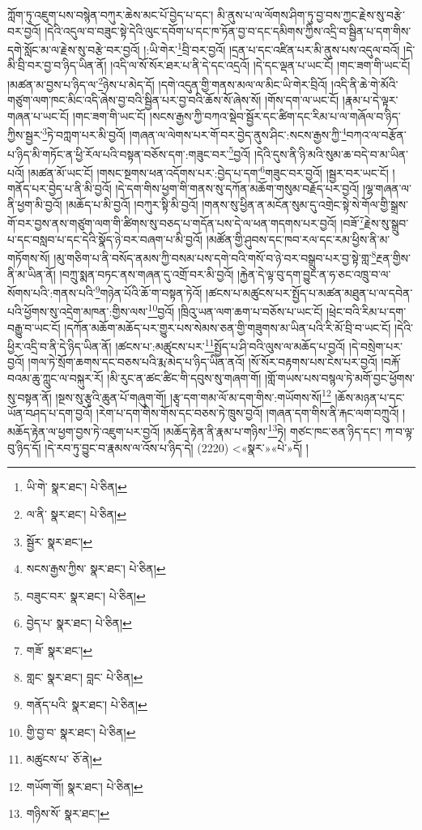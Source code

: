 ཀློག་ཏུ་འཇུག་པས་བསྙེན་བཀུར་ཆེས་མང་པོ་བྱེད་པ་དང་། མི་ནུས་པ་ལ་ལོགས་ཤིག་ཏུ་བྱ་བས་ཀྱང་རྗེས་སུ་བརྩེ་བར་བྱའོ། །དེའི་འདུལ་བ་བཟུང་སྟེ་དེའི་ལུང་དབོག་པ་དང་ཁ་ཏོན་བྱ་བ་དང་དམིགས་ཀྱིས་འདྲི་བ་སྦྱིན་པ་དག་གིས་དགེ་སློང་མ་ལ་རྗེས་སུ་བརྩེ་བར་བྱའོ། །:ཡི་གེར་\footnote{ཡི་གེ་  སྣར་ཐང་།  པེ་ཅིན། }བྲི་བར་བྱའོ། །དྲན་པ་དང་འཛིན་པར་མི་ནུས་པས་འདུལ་བའོ། །དེ་མི་བྲི་བར་བྱ་བ་ཉིད་ཡིན་ནོ། །འདི་ལ་སོ་སོར་ཐར་པ་ནི་དེ་དང་འདྲའོ། །དེ་དང་ལྡན་པ་ཡང་ངོ། །གང་ཟག་གི་ཡང་ངོ། །མཚན་མ་བྱས་པ་ཉིད་ལ་\footnote{ལ་ནི་  སྣར་ཐང་།  པེ་ཅིན། }ཉེས་པ་མེད་དོ། །དགེ་འདུན་གྱི་གནས་མལ་ལ་མིང་ཡི་གེར་བྲིའོ། །འདི་ནི་ཆེ་གེ་མོའི་གཙུག་ལག་ཁང་མིང་འདི་ཞེས་བྱ་བའི་སྦྱིན་པར་བྱ་བའི་ཆོས་སོ་ཞེས་སོ། །གོས་དག་ལ་ཡང་ངོ། །རྣམ་པ་དེ་ལྟར་གཞན་པ་ཡང་ངོ། །གང་ཟག་གི་ཡང་ངོ། །སངས་རྒྱས་ཀྱི་བཀའ་སྡེབ་སྦྱོར་དང་ཚིག་དང་རིམ་པ་ལ་གཞོལ་བ་ཉིད་ཀྱིས་སྦྱར་\footnote{སྦྱོར་  སྣར་ཐང་། }ཏེ་བཀླག་པར་མི་བྱའོ། །གཞན་ལ་ལེགས་པར་གོ་བར་བྱེད་ནུས་ཤིང་:སངས་རྒྱས་ཀྱི་\footnote{སངས་རྒྱས་ཀྱིས་  སྣར་ཐང་།  པེ་ཅིན། }བཀའ་ལ་བརྩོན་པ་ཉིད་མི་གཏོང་ན་ཕྱི་རོལ་པའི་བསྟན་བཅོས་དག་:གཟུང་བར་\footnote{བཟུང་བར་  སྣར་ཐང་།  པེ་ཅིན། }བྱའོ། །དེའི་དུས་ནི་ཉི་མའི་སུམ་ཆ་བདེ་བ་མ་ཡིན་པའོ། །མཚན་མོ་ཡང་ངོ། །གསང་སྔགས་ཕན་འདོགས་པར་:བྱེད་པ་དག་\footnote{བྱེད་པ་  སྣར་ཐང་།  པེ་ཅིན། }གཟུང་བར་བྱའོ། །སྦྱར་བར་ཡང་ངོ། །གནོད་པར་བྱེད་པ་ནི་མི་བྱའོ། །དེ་དག་གིས་ཕྱག་གི་གནས་སུ་དཀོན་མཆོག་གསུམ་བརྗོད་པར་བྱའོ། །ལྷ་གཞན་ལ་ནི་ཕྱག་མི་བྱའོ། །མཆོད་པ་མི་བྱའོ། །བཀུར་སྟི་མི་བྱའོ། །གནས་སུ་ཕྱིན་ན་མངོན་སུམ་དུ་འགྲེང་སྟེ་སེ་གོལ་གྱི་སྒྲས་གོ་བར་བྱས་ནས་གཙུག་ལག་གི་ཚིགས་སུ་བཅད་པ་གདོན་པས་དེ་ལ་ཕན་གདགས་པར་བྱའོ། །བཟོ་\footnote{གཟོ་  སྣར་ཐང་། }རྗེས་སུ་སྒྲུབ་པ་དང་བསླབ་པ་དང་དེའི་སྣོད་ཉེ་བར་བཞག་པ་མི་བྱའོ། །མཚོན་གྱི་ཤུབས་དང་ཁབ་རལ་དང་རམ་ཕྱིས་ནི་མ་གཏོགས་སོ། །མུ་གཅིག་པ་ནི་བསོད་ནམས་ཀྱི་བསམ་པས་དགེ་བའི་གསོ་བ་ཉེ་བར་བསྒྲུབ་པར་བྱ་སྟེ་གླ་\footnote{གླང་  སྣར་ཐང་། བླང་  པེ་ཅིན། }རྔན་གྱིས་ནི་མ་ཡིན་ནོ། །བཀྲུ་སྨན་བཏང་ནས་གཞན་དུ་འགྲོ་བར་མི་བྱའོ། །རྐྱེན་དེ་ལྟ་བུ་དག་བྱུང་ན་ཧ་ཅང་འཁྲུ་བ་ལ་སོགས་པའི་:གནས་པའི་\footnote{གནོད་པའི་  སྣར་ཐང་།  པེ་ཅིན། }གཉེན་པོའི་ཆོ་ག་བསྟན་ཏེའོ། །ཚངས་པ་མཚུངས་པར་སྤྱོད་པ་མཚན་མཐུན་པ་ལ་དབེན་པའི་ཕྱོགས་སུ་འདྲེག་མཁན་:གྱིས་ལས་\footnote{གྱི་བྱ་བ་  སྣར་ཐང་།  པེ་ཅིན། }བྱའོ། །ཁྲིའུ་ཡན་ལག་ཆག་པ་བཅོས་པ་ཡང་ངོ། །ཕྲེང་བའི་རིམ་པ་དག་བརྒྱུ་བ་ཡང་ངོ། །དཀོན་མཆོག་མཆོད་པར་གྱུར་པས་སེམས་ཅན་གྱི་གཟུགས་མ་ཡིན་པའི་རི་མོ་བྲི་བ་ཡང་ངོ། །དེའི་ཕྱིར་འདྲི་བ་ནི་དེ་ཉིད་ཡིན་ནོ། །ཚངས་པ་:མཚུངས་པར་\footnote{མཚུངས་པ་  ཅོ་ནེ། }སྤྱོད་པ་ཤི་བའི་ལུས་ལ་མཆོད་པ་བྱའོ། །དེ་བསྲེག་པར་བྱའོ། །གལ་ཏེ་སྲོག་ཆགས་དང་བཅས་པའི་རྨ་མེད་པ་ཉིད་ཡིན་ནའོ། །སོ་སོར་བརྟགས་པས་ངེས་པར་བྱའོ། །བརྐོ་བའམ་ཆུ་ཀླུང་ལ་བསྐུར་རོ། །མི་རུང་ན་ཚང་ཚིང་གི་དབུས་སུ་གཞག་གོ། །གློ་གཡས་པས་བསྙལ་ཏེ་མགོ་བྱང་ཕྱོགས་སུ་བསྟན་ནོ། །སྔས་སུ་རྩྭའི་ཆུན་པོ་གཞུག་གོ། །རྩྭ་དག་གམ་ལོ་མ་དག་གིས་:གཡོགས་སོ།\footnote{གཡོག་གོ།  སྣར་ཐང་།  པེ་ཅིན། } །ཆོས་མཉན་པ་དང་ཡོན་བཤད་པ་དག་བྱའོ། །རེག་པ་དག་གིས་གོས་དང་བཅས་ཏེ་ཁྲུས་བྱའོ། །གཞན་དག་གིས་ནི་རྐང་ལག་བཀྲུའོ། །མཆོད་རྟེན་ལ་ཕྱག་བྱས་ཏེ་འཇུག་པར་བྱའོ། །མཆོད་རྟེན་ནི་རྣམ་པ་གཉིས་\footnote{གཉིས་སོ་  སྣར་ཐང་། }ཏེ། གཙང་ཁང་ཅན་ཉིད་དང་། ཀ་བ་ལྟ་བུ་ཉིད་དོ། །དེ་རབ་ཏུ་བྱུང་བ་རྣམས་ལ་འོས་པ་ཉིད་དེ། (2220) <«སྣར་»«པེ་»དོ། །
